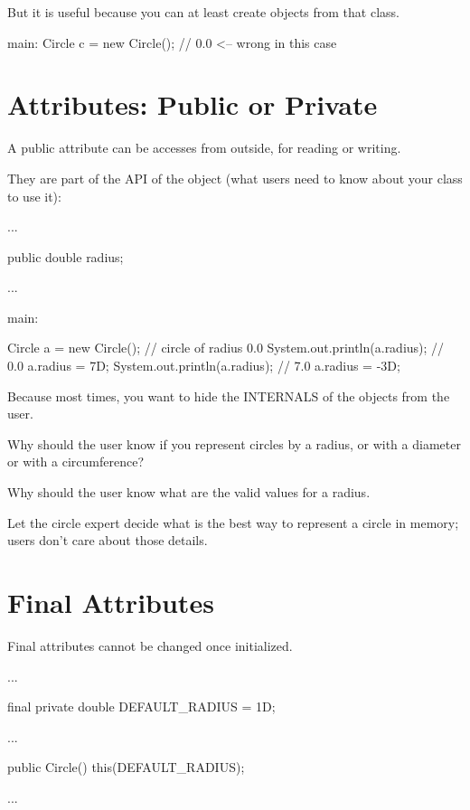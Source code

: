 \documentclass[a4paper, 9pt]{extarticle}
\begin{document}
But it is useful because you can at least create objects from that class.

\begin{blackboard}
main:
  Circle c = new Circle(); // 0.0 <-- wrong in this case
\end{blackboard}









\section{Attributes: Public or Private}

A public attribute can be accesses from outside, for reading or writing.

They are part of the API of the object (what users need to know about your
class to use it):

\begin{blackboard}

  ...

  public double radius;

  ...

main:

Circle a = new Circle(); // circle of radius 0.0
System.out.println(a.radius); // 0.0
a.radius = 7D;
System.out.println(a.radius); // 7.0
a.radius = -3D;
\end{blackboard}

Because most times, you want to hide the INTERNALS of the objects from the
user.

Why should the user know if you represent circles by a radius, or with a
diameter or with a circumference?

Why should the user know what are the valid values for a radius.

Let the circle expert decide what is the best way to represent a circle in
memory; users don't care about those details.










\section{Final Attributes}

Final attributes cannot be changed once initialized.

\begin{blackboard}

  ...

  final private double DEFAULT_RADIUS = 1D;

  ...

  public Circle() {
    this(DEFAULT_RADIUS);
  }

  ...

\end{blackboard}
\end{document}
